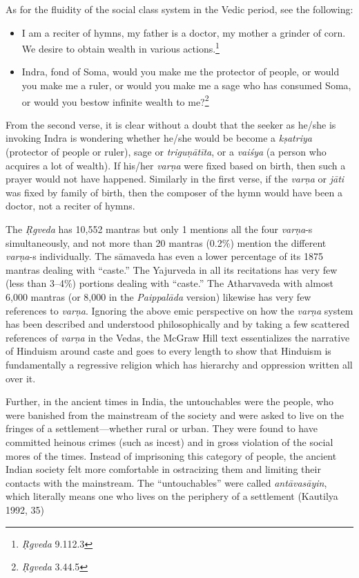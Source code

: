 As for the fluidity of the social class system in the Vedic period, see the following:

\begin{itemize} 
\item I am a reciter of hymns, my father is a doctor, my mother a grinder of corn. We desire to obtain wealth in various actions.\footnote{\textit{Ṛgveda} 9.112.3}
\item Indra, fond of Soma, would you make me the protector of people, or would you make me a ruler, or would you make me a sage who has consumed Soma, or would you bestow infinite wealth to me?\footnote{\textit{Ṛgveda} 3.44.5} 
\end{itemize}

From the second verse, it is clear without a doubt that the seeker as he/she is invoking Indra is wondering whether he/she would be become a \textit{kṣatriya} (protector of people or ruler), sage or \textit{triguṇātīta},  or a \textit{vaiśya} (a person who acquires a lot of wealth). If his/her \textit{varṇa} were fixed based on birth, then such a prayer would not have happened. Similarly in the first verse, if the \textit{varṇa} or \textit{jāti} was fixed by family of birth, then the composer of the hymn would have been a doctor, not a reciter of hymns. 

The \textit{Ṛgveda} has 10,552 mantras but only 1 mentions all the four \textit{varṇa}-s simultaneously, and not more than 20 mantras (0.2\%) mention the different \textit{varṇa}-s individually. The sāmaveda has even a lower percentage of its 1875 mantras dealing with “caste.” The Yajurveda in all its recitations has very few (less than 3--4\%) portions dealing with “caste.” The Atharvaveda with almost 6,000 mantras (or 8,000 in the \textit{Paippalāda} version) likewise has very few references to \textit{varṇa}. Ignoring the above emic perspective on how the \textit{varṇa} system has been described and understood philosophically and by taking a few scattered references of \textit{varṇa} in the Vedas, the McGraw Hill text essentializes the narrative of Hinduism around caste and goes to every length to show that Hinduism is fundamentally a regressive religion which has hierarchy and oppression written all over it. 

Further, in the ancient times in India, the untouchables were the people, who were banished from the mainstream of the society and were asked to live on the fringes of a settlement—whether rural or urban. They were found to have committed heinous crimes (such as incest) and in gross violation of the social mores of the times. Instead of imprisoning this category of people, the ancient Indian society felt more comfortable in ostracizing them and limiting their contacts with the mainstream. The “untouchables” were called \textit{antāvasāyin},  which literally means one who lives on the periphery of a settlement (Kautilya 1992, 35)

